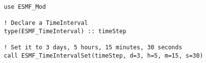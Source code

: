 
\begin{verbatim}
use ESMF_Mod

! Declare a TimeInterval
type(ESMF_TimeInterval) :: timeStep

! Set it to 3 days, 5 hours, 15 minutes, 30 seconds
call ESMF_TimeIntervalSet(timeStep, d=3, h=5, m=15, s=30)

\end{verbatim}
